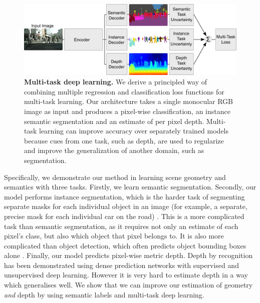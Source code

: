 \begin{figure}[t]
\begin{center}
		\includegraphics[width=\linewidth]{figures/multitask-architecture.pdf}    
\end{center}
   \caption[Multi-task deep learning for scene understanding.]{\textbf{Multi-task deep learning.} We derive a principled way of combining multiple regression and classification loss functions for multi-task learning. Our architecture takes a single monocular RGB image as input and produces a pixel-wise classification, an instance semantic segmentation and an estimate of per pixel depth. Multi-task learning can improve accuracy over separately trained models because cues from one task, such as depth, are used to regularize and improve the generalization of another domain, such as segmentation.}
\label{fig:teaser}
\end{figure}

Specifically, we demonstrate our method in learning scene geometry and semantics with three tasks. Firstly, we learn semantic segmentation. Secondly, our model performs instance segmentation, which is the harder task of segmenting separate masks for each individual object in an image (for example, a separate, precise mask for each individual car on the road) \citep{pinheiro2015learning,hariharan2015hypercolumns,dai2016instance,bai2016deep,de2017semantic}. This is a more complicated task than semantic segmentation, as it requires not only an estimate of each pixel's class, but also which object that pixel belongs to. It is also more complicated than object detection, which often predicts object bounding boxes alone \citep{girshick2014rich}. Finally, our model predicts pixel-wise metric depth. Depth by recognition has been demonstrated using dense prediction networks with supervised \citep{eigen2015predicting} and unsupervised \citep{garg2016unsupervised} deep learning. However it is very hard to estimate depth in a way which generalises well. We show that we can improve our estimation of geometry \textit{and} depth by using semantic labels and multi-task deep learning.

